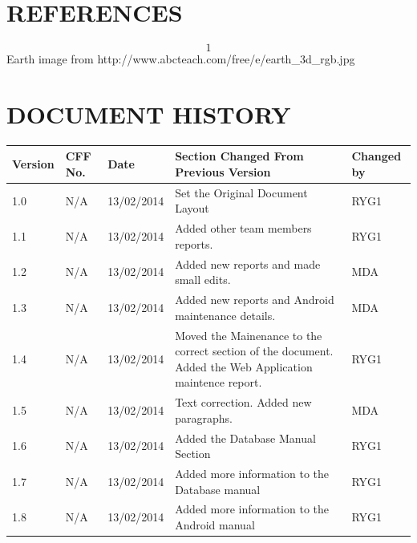 \documentclass[12pt]{article}
\begin{document}
\section{REFERENCES}
\[1\]Earth image from http://www.abcteach.com/free/e/earth\_3d\_rgb.jpg

\newpage
\section{DOCUMENT HISTORY}
\setlength\LTleft{-0.5cm}
\begin{longtable}{|p{1.3cm}|p{1.5cm}|p{2cm}|p{7cm}| p{2cm}|}
\hline
	Version & CFF No. & Date & Section Changed From Previous Version & Changed by \\
\hline
	1.0&N/A&13/02/2014&Set the Original Document Layout&RYG1
 \\ 
\hline
	1.1&N/A&13/02/2014&Added other team members reports.&RYG1 \\
\hline
	1.2&N/A&13/02/2014&Added new reports and made small edits.&MDA \\
	\hline
	1.3&N/A&13/02/2014&Added new reports and Android maintenance details.&MDA \\
\hline
	1.4&N/A&13/02/2014&Moved the Mainenance to the correct section of the document. Added the Web Application maintence report.&RYG1 \\
\hline
	1.5&N/A&13/02/2014&Text correction. Added new paragraphs.&MDA \\
\hline	
	1.6&N/A&13/02/2014&Added the Database Manual Section&RYG1 \\
\hline
	1.7&N/A&13/02/2014&Added more information to the Database manual&RYG1 \\
\hline		
	1.8&N/A&13/02/2014&Added more information to the Android manual&RYG1 \\
	\hline
\end{longtable}
\end{document}
